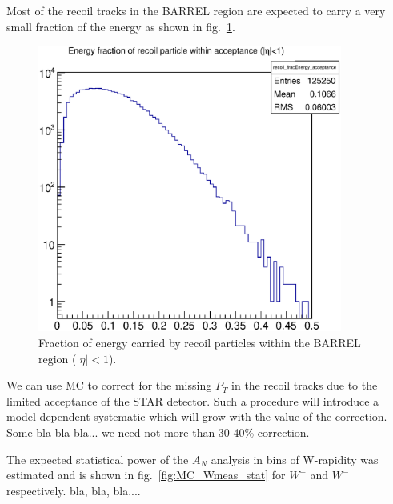 \documentclass[12pt]{article}
\begin{document}
Most of the recoil tracks in the BARREL region are expected to carry a very small fraction of the energy as shown in fig.~\ref{fig:MC_recoil_Efrac}.

\begin{figure}[tbhp]
\begin{center}
\includegraphics[width=10cm]{images/recoil_energy_frac.eps}
\end{center}
\caption{\label{fig:MC_recoil_Efrac} Fraction of energy carried by recoil particles within the BARREL region ($|\eta|<1$).}
\end{figure}

We can use MC to correct for the missing $P_{T}$ in the recoil tracks due to the limited acceptance of the STAR detector. Such a procedure will introduce a model-dependent systematic which will grow with the value of the correction.   Some bla bla bla... we need not more than 30-40\% correction.

The expected statistical power of the $A_N$ analysis in bins of W-rapidity was estimated and is shown in fig.~\ref{fig:MC_Wmeas_stat} for $W^+$ and $W^-$ respectively. bla, bla, bla....
\end{document}
